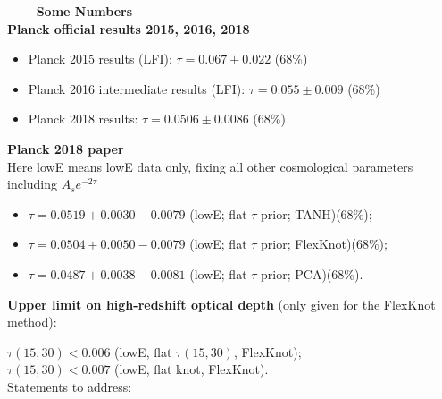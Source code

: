 \documentclass[prd,twocolumn,amsmath,amssymb,floatfix,superscriptaddress,nofootinbib]{revtex4-1}
\begin{document}
------ \textbf{Some Numbers} ------ \\

\textbf{Planck official results 2015, 2016, 2018} \\

\begin{itemize}
    
    \item Planck 2015 results (LFI): $\tau = 0.067 \pm 0.022$ (68\%) \\

    \item Planck 2016  intermediate results (LFI): $\tau = 0.055 \pm 0.009$ (68\%) \\
    
    \item Planck 2018 results: $\tau = 0.0506 \pm 0.0086$ (68\%) \\

\end{itemize}

\textbf{Planck 2018 paper} \\

Here lowE means lowE data only, fixing all other cosmological parameters including $A_s e^{-2\tau}$\\

\begin{itemize}

\item $\tau = 0.0519+0.0030-0.0079$ (lowE; flat $\tau$ prior; TANH)(68\%); \\

\item $\tau = 0.0504+0.0050
-0.0079$ (lowE; flat $\tau$ prior; FlexKnot)(68\%); \\

\item $\tau = 0.0487+0.0038
−0.0081$ (lowE; flat $\tau$ prior; PCA)(68\%).

\end{itemize}

\textbf{Upper limit on high-redshift optical depth} (only given for the FlexKnot method):

$\tau(15, 30) < 0.006$ (lowE, flat $\tau(15, 30)$, FlexKnot); \\

$\tau(15, 30) < 0.007$ (lowE, flat knot, FlexKnot).\\

Statements to address:
\end{document}
